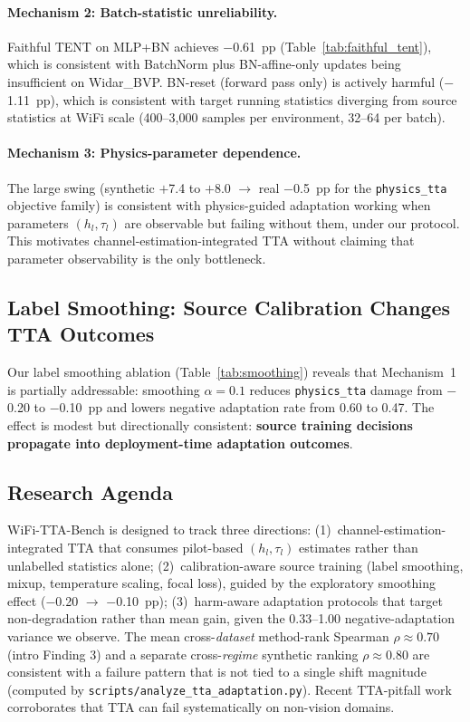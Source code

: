 \paragraph{Mechanism 2: Batch-statistic unreliability.} Faithful TENT on MLP+BN achieves $-$0.61~pp (Table~\ref{tab:faithful_tent}), which is consistent with BatchNorm plus BN-affine-only updates being insufficient on Widar\_BVP. BN-reset (forward pass only) is actively harmful ($-$1.11~pp), which is consistent with target running statistics diverging from source statistics at WiFi scale (400--3,000 samples per environment, 32--64 per batch).

\paragraph{Mechanism 3: Physics-parameter dependence.} The large swing (synthetic $+$7.4 to $+$8.0 $\to$ real $-$0.5~pp for the \texttt{physics\_tta} objective family) is consistent with physics-guided adaptation working when parameters $(h_l, \tau_l)$ are observable but failing without them, under our protocol. This motivates channel-estimation-integrated TTA without claiming that parameter observability is the only bottleneck.

\subsection{Label Smoothing: Source Calibration Changes TTA Outcomes}

Our label smoothing ablation (Table~\ref{tab:smoothing}) reveals that Mechanism~1 is partially addressable: smoothing $\alpha{=}0.1$ reduces \texttt{physics\_tta} damage from $-$0.20 to $-$0.10~pp and lowers negative adaptation rate from 0.60 to 0.47. The effect is modest but directionally consistent: \textbf{source training decisions propagate into deployment-time adaptation outcomes}.

\subsection{Research Agenda}

WiFi-TTA-Bench is designed to track three directions: (1)~channel-estimation-integrated TTA that consumes pilot-based $(h_l,\tau_l)$ estimates rather than unlabelled statistics alone; (2)~calibration-aware source training (label smoothing, mixup, temperature scaling, focal loss), guided by the exploratory smoothing effect ($-$0.20 $\to$ $-$0.10~pp); (3)~harm-aware adaptation protocols that target non-degradation rather than mean gain, given the 0.33--1.00 negative-adaptation variance we observe. The mean cross-\emph{dataset} method-rank Spearman $\rho{\approx}0.70$ (intro Finding 3) and a separate cross-\emph{regime} synthetic ranking $\rho{\approx}0.80$ are consistent with a failure pattern that is not tied to a single shift magnitude (computed by \texttt{scripts/analyze\_tta\_adaptation.py}). Recent TTA-pitfall work~\cite{zhao2023pitfalls,press2024rdumb} corroborates that TTA can fail systematically on non-vision domains.
